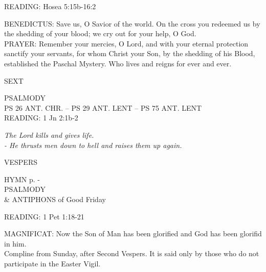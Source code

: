 \noindent\small{\uppercase{READING:}}    Hosea 5:15b-16:2 \textbf{   \\}

\noindent\small{\uppercase{BENEDICTUS:}}	Save us, O Savior of the world. On the cross you redeemed us by the shedding of your blood; we cry out for your help, O God.\\

\noindent\small{\uppercase{PRAYER:}}	Remember your mercies, O Lord, and with your eternal protection sanctify your servants, for whom Christ your Son, by the shedding of his Blood, established the Paschal Mystery. Who lives and reigns for ever and ever.

\begin{flushleft}\normalsize{\uppercase{SEXT\\}}\end{flushleft}
\noindent\small{\uppercase{PSALMODY}\\}
\uppercase{Ps 26 ant. Chr. -- Ps 29 ant. Lent -- Ps 75 ant. Lent}\vspace{0.5em}\\

\noindent\small{\uppercase{READING:}}    1 Jn 2:1b-2 \textbf{   \\}
\begin{center}
\textit{The Lord kills and gives life.\\
- He thrusts men down to hell and raises them up again.}\end{center}

\begin{flushleft}\normalsize{\uppercase{VESPERS\\}}\end{flushleft}
\small{\uppercase{HYMN} p. \pageref{lent:firstHymn}-\pageref{lent:lastHymn}\\}
\noindent\small{\uppercase{PSALMODY}\\} \& ANTIPHONS of Good Friday

\noindent\small{\uppercase{READING:}}    1 Pet 1:18-21 \textbf{   \\}

\noindent\small{\uppercase{MAGNIFICAT:}}	Now the Son of Man has been glorified and God has been glorifid in him.\\

Compline from Sunday, after Second Vespers. It is said only by those who do not participate in the Easter Vigil.
